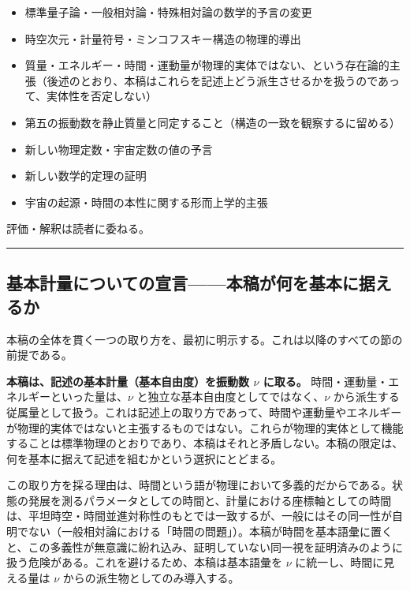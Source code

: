 \documentclass[
]{ltjsarticle}
\providecommand{\tightlist}{%
  \setlength{\itemsep}{0pt}\setlength{\parskip}{0pt}}
\begin{document}
\begin{itemize}
\tightlist
\item
  標準量子論・一般相対論・特殊相対論の数学的予言の変更
\item
  時空次元・計量符号・ミンコフスキー構造の物理的導出
\item
  質量・エネルギー・時間・運動量が物理的実体ではない、という存在論的主張（後述のとおり、本稿はこれらを記述上どう派生させるかを扱うのであって、実体性を否定しない）
\item
  第五の振動数を静止質量と同定すること（構造の一致を観察するに留める）
\item
  新しい物理定数・宇宙定数の値の予言
\item
  新しい数学的定理の証明
\item
  宇宙の起源・時間の本性に関する形而上学的主張
\end{itemize}

評価・解釈は読者に委ねる。

\begin{center}\rule{0.5\linewidth}{0.5pt}\end{center}

\subsection{基本計量についての宣言------本稿が何を基本に据えるか}\label{ux57faux672cux8a08ux91cfux306bux3064ux3044ux3066ux306eux5ba3ux8a00ux672cux7a3fux304cux4f55ux3092ux57faux672cux306bux636eux3048ux308bux304b}

本稿の全体を貫く一つの取り方を、最初に明示する。これは以降のすべての節の前提である。

\textbf{本稿は、記述の基本計量（基本自由度）を振動数 \(\nu\) に取る。}
時間・運動量・エネルギーといった量は、\(\nu\)
と独立な基本自由度としてではなく、\(\nu\)
から派生する従属量として扱う。これは記述上の取り方であって、時間や運動量やエネルギーが物理的実体ではないと主張するものではない。これらが物理的実体として機能することは標準物理のとおりであり、本稿はそれと矛盾しない。本稿の限定は、何を基本に据えて記述を組むかという選択にとどまる。

この取り方を採る理由は、時間という語が物理において多義的だからである。状態の発展を測るパラメータとしての時間と、計量における座標軸としての時間は、平坦時空・時間並進対称性のもとでは一致するが、一般にはその同一性が自明でない（一般相対論における「時間の問題」）。本稿が時間を基本語彙に置くと、この多義性が無意識に紛れ込み、証明していない同一視を証明済みのように扱う危険がある。これを避けるため、本稿は基本語彙を
\(\nu\) に統一し、時間に見える量は \(\nu\)
からの派生物としてのみ導入する。
\end{document}
